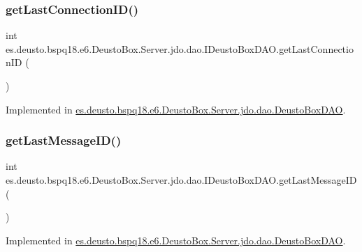 \subsubsection{\texorpdfstring{get\+Last\+Connection\+I\+D()}{getLastConnectionID()}}
{\footnotesize\ttfamily int es.\+deusto.\+bspq18.\+e6.\+Deusto\+Box.\+Server.\+jdo.\+dao.\+I\+Deusto\+Box\+D\+A\+O.\+get\+Last\+Connection\+ID (\begin{DoxyParamCaption}{ }\end{DoxyParamCaption})}



Implemented in \mbox{\hyperlink{classes_1_1deusto_1_1bspq18_1_1e6_1_1_deusto_box_1_1_server_1_1jdo_1_1dao_1_1_deusto_box_d_a_o_a93943c61dcd773e7d4828fd99b5904c9}{es.\+deusto.\+bspq18.\+e6.\+Deusto\+Box.\+Server.\+jdo.\+dao.\+Deusto\+Box\+D\+AO}}.

\mbox{\label{interfacees_1_1deusto_1_1bspq18_1_1e6_1_1_deusto_box_1_1_server_1_1jdo_1_1dao_1_1_i_deusto_box_d_a_o_a266cc12f9fe62e9b8083ef47a84be129}} 
\subsubsection{\texorpdfstring{get\+Last\+Message\+I\+D()}{getLastMessageID()}}
{\footnotesize\ttfamily int es.\+deusto.\+bspq18.\+e6.\+Deusto\+Box.\+Server.\+jdo.\+dao.\+I\+Deusto\+Box\+D\+A\+O.\+get\+Last\+Message\+ID (\begin{DoxyParamCaption}{ }\end{DoxyParamCaption})}



Implemented in \mbox{\hyperlink{classes_1_1deusto_1_1bspq18_1_1e6_1_1_deusto_box_1_1_server_1_1jdo_1_1dao_1_1_deusto_box_d_a_o_acfc34cbf454de0b8ef1bc83ef8c41562}{es.\+deusto.\+bspq18.\+e6.\+Deusto\+Box.\+Server.\+jdo.\+dao.\+Deusto\+Box\+D\+AO}}.

